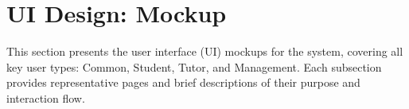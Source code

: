 \section{UI Design: Mockup}

\noindent This section presents the user interface (UI) mockups for the system, covering all key user types: Common, Student, Tutor, and Management.  
Each subsection provides representative pages and brief descriptions of their purpose and interaction flow.








